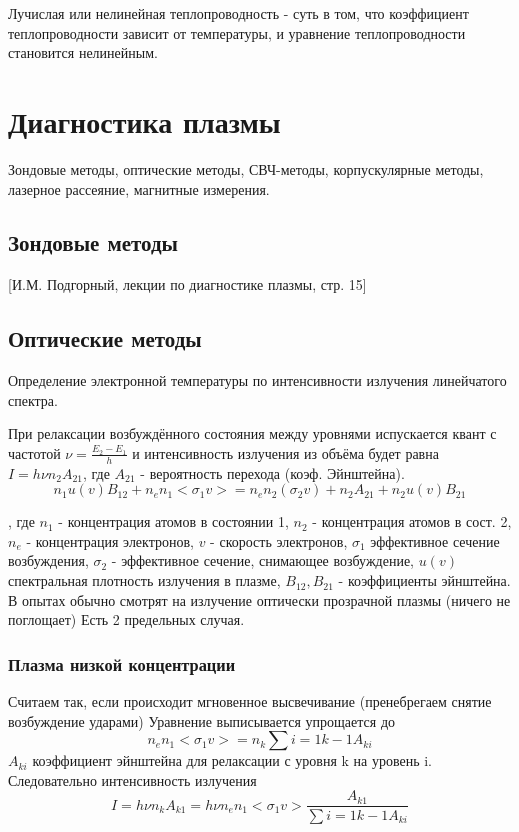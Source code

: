 \documentclass[10pt, a4paper]{article}
\begin{document}
Лучислая или нелинейная теплопроводность - суть в том, что коэффициент теплопроводности зависит от температуры, и уравнение теплопроводности становится нелинейным.


\section{Диагностика плазмы}
\label{sec.11}

Зондовые методы, оптические методы, СВЧ-методы, корпускулярные методы, лазерное рассеяние, магнитные измерения.

\subsection{Зондовые методы}
\label{11.1}

[И.М. Подгорный, лекции по диагностике плазмы, стр. 15]

\subsection{Оптические методы}
\label{11.2}

Определение электронной температуры по интенсивности излучения линейчатого спектра.

При релаксации возбуждённого состояния между уровнями испускается квант с частотой $\nu=\frac{E_2-E_1}{h}$ и интенсивность излучения из объёма будет равна $I=h\nu n_{2} A_{21}$, где $A_{21}$ - вероятность перехода (коэф. Эйнштейна).
\begin{equation}
	n_1 u(v)B_{12}+n_e n_1 <\sigma_1 v>=n_e n_2 (\sigma_2 v) + n_2 A_{21}+n_2 u(v) B_{21}
\end{equation}

, где $n_1$ - концентрация атомов в состоянии 1, $n_2$ - концентрация атомов в сост. 2, $n_e$ - концентрация электронов, $v$ - скорость электронов, $\sigma_1$ эффективное сечение возбуждения, $\sigma_2$ - эффективное сечение, снимающее возбуждение, $u(v)$ спектральная плотность излучения в плазме, $B_{12}, B_{21}$ - коэффициенты эйнштейна. В опытах обычно смотрят на излучение оптически прозрачной плазмы (ничего не поглощает) Есть 2 предельных случая.

\subsubsection{Плазма низкой концентрации}
\label{11.2.1}
Считаем так, если происходит мгновенное высвечивание (пренебрегаем снятие возбуждение ударами)
Уравнение выписывается упрощается до 
\begin{equation}
	n_e n_1 <\sigma_1 v>= n_k  \sum {i=1}{k-1}A_{k i}
\end{equation}
$A_{k i}$ коэффициент эйнштейна для релаксации с уровня k на уровень i.
Следовательно интенсивность излучения 
\begin{equation}
	I=h \nu n_k A_{k1}=h \nu n_e n_1 <\sigma_1 v>\frac{A_{k1}}{\sum{i=1}{k-1} A_{ki}}
\end{equation}
\end{document}
